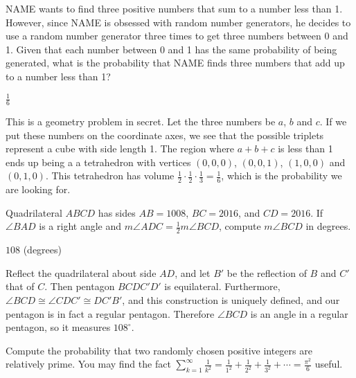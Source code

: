 \documentclass[11pt]{article}
\begin{document}
\begin{problem} %
NAME wants to find three positive numbers that sum to a number less than 1. However, since NAME is obsessed with random number generators, he decides to use a random number generator three times to get three numbers between 0 and 1. Given that each number between 0 and 1 has the same probability of being generated, what is the probability that NAME finds three numbers that add up to a number less than 1?
\end{problem}

\begin{answer}
$\frac{1}{6}$
\end{answer}

\begin{solution}
This is a geometry problem in secret. Let the three numbers be $a$, $b$ and $c$. If we put these numbers on the coordinate axes, we see that the possible triplets represent a cube with side length 1. The region where $a + b + c$ is less than 1 ends up being a a tetrahedron with vertices $(0, 0, 0)$, $(0, 0, 1)$, $(1, 0, 0)$ and $(0, 1, 0)$. This tetrahedron has volume $\frac{1}{2} \cdot \frac{1}{2} \cdot \frac{1}{3} = \frac{1}{6}$, which is the probability we are looking for.
\end{solution}


\begin{problem}%
Quadrilateral $ABCD$ has sides $AB = 1008$, $BC = 2016$, and $CD = 2016$. If $\angle BAD$ is a right angle and $m\angle ADC = \frac{1}{2}m\angle BCD$, compute $m\angle BCD$ in degrees.
\end{problem}

\begin{answer}
$\boxed{108}$ (degrees)
\end{answer}

\begin{solution}
Reflect the quadrilateral about side $AD$, and let $B'$ be the reflection of $B$ and $C'$ that of $C$. Then pentagon $BCDC'D'$ is equilateral. Furthermore, $\angle BCD \cong \angle CDC' \cong DC'B'$, and this construction is uniquely defined, and our pentagon is in fact a regular pentagon. Therefore $\angle BCD$ is an angle in a regular pentagon, so it measures $\boxed{108^\circ}$.
\end{solution}


\begin{problem}
Compute the probability that two randomly chosen positive integers are relatively prime. You may find the fact $\sum\limits_{k = 1}^\infty \frac{1}{k^2} = \frac{1}{1^2} + \frac{1}{2^2} + \frac{1}{3^2} + \cdots = \frac{\pi^2}{6}$ useful.
\end{problem}
\end{document}
